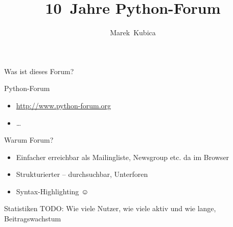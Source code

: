 \documentclass{beamer}
\title{10~Jahre Python-Forum}
\author{Marek~Kubica}
\institute{PyCon DE 2012}
\begin{document}
\setmainfont{Latin Modern Roman}
\setsansfont{Latin Modern Sans}
\setmonofont{Latin Modern Mono}


\newcommand{\dejavu}[1]{{\setsansfont{DejaVu Sans}\selectfont #1}}

\begin{frame}{Was ist dieses Forum?}
  \begin{block}{Python-Forum}
    \begin{itemize}
      \item \url{http://www.python-forum.org}
      \item …
    \end{itemize}
  \end{block}
  \begin{block}{Warum Forum?}
    \begin{itemize}
      \item Einfacher erreichbar als Mailingliste, Newsgroup etc. da im Browser
      \item Strukturierter – durchsuchbar, Unterforen
      \item Syntax-Highlighting \dejavu{☺}
    \end{itemize}
  \end{block}
\end{frame}

\begin{frame}{Statistiken}
  TODO: Wie viele Nutzer, wie viele aktiv und wie lange, Beitragswachstum
\end{frame}
\end{document}
